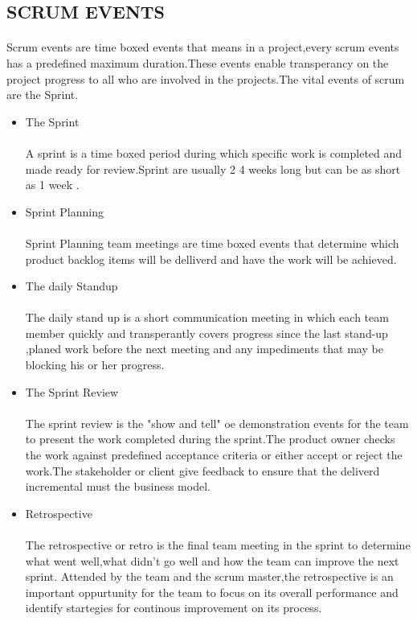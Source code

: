 \documentclass[a4paper, 12pt]{report}
\begin{document}
\subsection{ SCRUM EVENTS}

\paragraph{}Scrum events are time boxed events that means in a project,every scrum events has a predefined maximum duration.These events enable transperancy on the project progress to all who are involved in the projects.The vital events of scrum are the Sprint.
\begin{itemize} 
\item The Sprint
\paragraph{}A sprint is a time boxed period during which specific work is completed and made ready for review.Sprint are usually 2 4 weeks long but can be as short as 1 week .
\item Sprint Planning
\paragraph{}Sprint Planning team meetings are time boxed events that determine which product backlog items will be delliverd and have the work will be achieved.
\item The daily Standup
\paragraph{}The daily stand up is a short communication meeting in which each
team member quickly and transperantly covers progress since the last stand-up ,planed work before the next meeting and any impediments that may be blocking his or her progress.
\item The Sprint Review
\paragraph{}The sprint review is the "show and tell" oe demonstration events for the team to present the work completed during the sprint.The product owner checks the work against predefined acceptance criteria or either accept or reject the work.The stakeholder or client give feedback to ensure that the deliverd incremental must the business model.
\item Retrospective
\paragraph{}The retrospective or retro is the final team meeting in the sprint to determine what went well,what didn't go well and how the team can improve the next sprint. Attended by the team and the scrum master,the retrospective is an important oppurtunity for the team to focus on its overall performance and identify startegies for continous improvement on its process.
\end{itemize}
\end{document}
